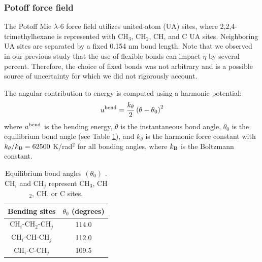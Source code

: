 \documentclass[preprint,review,12pt]{elsarticle}
\begin{document}
    \subsubsection{Potoff force field}
	
	The Potoff Mie $\lambda$-6 force field utilizes united-atom (UA) sites, where 2,2,4-trimethylhexane is represented with CH$_3$, CH$_2$, CH, and C UA sites. Neighboring UA sites are separated by a fixed 0.154 nm bond length. Note that we observed in our previous study that the use of flexible bonds can impact $\eta$ by several percent. Therefore, the choice of fixed bonds was not arbitrary and is a possible source of uncertainty for which we did not rigorously account. 
	
	The angular contribution to energy is computed using a harmonic potential:
	\begin{equation}
	u^{\rm bend} = \frac{k_\theta}{2} \left(\theta-\theta_0\right)^2
	\end{equation}
	where $u^{\rm bend}$ is the bending energy, $\theta$ is the instantaneous bond angle, $\theta_0$ is the equilibrium bond angle (see Table \ref{tab:angles}), and $k_\theta$ is the harmonic force constant with $k_\theta/k_{\rm B} = 62500$ K/rad$^2$ for all bonding angles, where $k_{\rm B}$ is the Boltzmann constant. 
	
	\begin{table}[h!]
		\caption{Equilibrium bond angles $(\theta_0)$ \cite{Martin1999,Potoff_branched}. CH$_i$ and CH$_j$ represent CH$_3$, CH$_2$, CH, or C sites.} \label{tab:angles}
		\begin{center}
			\begin{tabular}{|c|c|}
				\hline
				Bending sites & $\theta_0$ (degrees) \\ \hline
				CH$_i$-CH$_2$-CH$_j$ & 114.0 \\ 
				CH$_i$-CH-CH$_j$ & 112.0 \\ 
				CH$_i$-C-CH$_j$ & 109.5 \\  
				\hline
			\end{tabular}
		\end{center} 
	\end{table}
	
	
\end{document}
